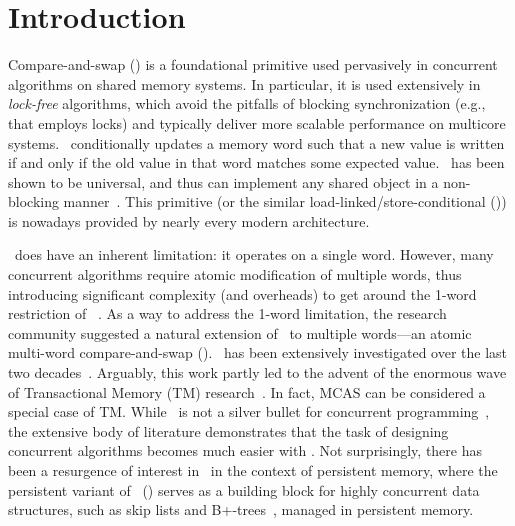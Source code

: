 
\section{Introduction}
\label{sec:intro}

Compare-and-swap (\cas) is a foundational primitive used 
pervasively in concurrent algorithms on shared
memory systems. In particular, it is used extensively in \textit{lock-free} algorithms, which 
avoid the pitfalls of blocking synchronization (e.g., that employs locks) 
and typically deliver more scalable performance on multicore systems.
\cas\ conditionally updates a memory word such that a new value is written if 
and only if the old value in that word matches some expected value.
\cas\ has been shown to be universal, and thus can implement any shared object in a 
non-blocking manner~\cite{herlihy93}. This primitive (or the similar load-linked/store-conditional (\llsc)) is nowadays
provided by nearly every modern architecture.

\cas\ does have an inherent limitation: it operates on a single word.
However, many concurrent algorithms require atomic modification of
multiple words, thus introducing significant complexity (and
overheads) to get around the 1-word restriction of
\cas~\cite{braginsky12,detlefs00,greenwald99,greenwald02,levandoski13,natarajan14}.
As a way to address the 1-word limitation, the research community suggested a
natural extension of \cas\ to multiple words---an
atomic multi-word compare-and-swap (\mcas).  \mcas\ has been
extensively investigated over the last two
decades~\cite{anderson95,anderson97,detlefs00,greenwald99,greenwald02,harris02,herlihy93,moir97,shavit95}.
Arguably, this work partly led to the advent of the enormous wave of
Transactional Memory (TM) research~\cite{harris10,harris03,herlihy93a}.  In
fact, MCAS can be considered a special case of TM.
While \mcas\ is not a silver bullet for concurrent
programming~\cite{doherty04,herlihy03}, the extensive body of literature
demonstrates that the task of designing concurrent algorithms becomes
much easier with \mcas.  
Not surprisingly, there has been a resurgence
of interest in \mcas\ in the context of persistent memory, where the persistent
variant of \mcas\ (\pmcas) serves as a building block for highly
concurrent data structures, such as skip lists and
B+-trees~\cite{arulraj18,wang18}, managed in persistent memory.


